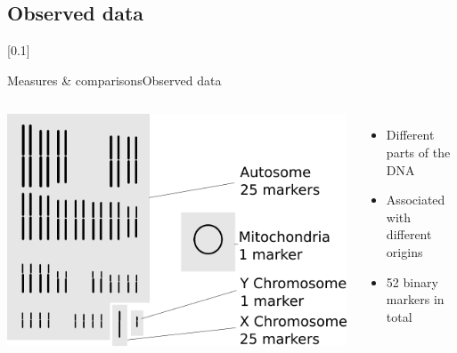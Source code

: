 \documentclass[10pt, aspectratio=43]{beamer}
\begin{document}
\subsection{Observed data}
[0.1]{}{}{}
\begin{frame}{Measures \& comparisons}{Observed data}
\begin{columns}
  \includegraphics[width=1\textwidth]{../data/markers.png}

  \begin{itemize}
    \item Different parts of the DNA
    \item Associated with different origins
    \item 52 binary markers in total
  \end{itemize}

\end{columns}
\end{frame}
\end{document}
